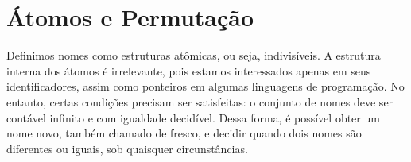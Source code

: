 

\section{Átomos e Permutação}\label{sec:atomos-permutacao}
Definimos nomes como estruturas atômicas, ou seja, indivisíveis. A estrutura interna dos átomos é irrelevante, pois estamos interessados apenas em seus identificadores, assim como ponteiros em algumas linguagens de programação. No entanto, certas condições precisam ser satisfeitas: o conjunto de nomes deve ser contável infinito %
e com igualdade decidível. Dessa forma, é possível obter um nome novo, também chamado de fresco, e decidir quando dois nomes são diferentes ou iguais, sob quaisquer circunstâncias.

